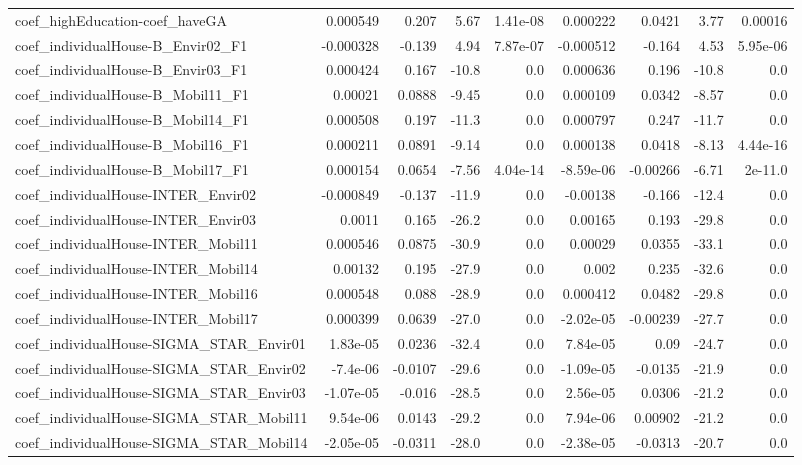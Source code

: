 \begin{tabular}{lrrrrrrrr}
coef_highEducation-coef_haveGA & 0.000549 & 0.207 & 5.67 & 1.41e-08 & 0.000222 & 0.0421 & 3.77 & 0.00016 \\
coef_individualHouse-B_Envir02_F1 & -0.000328 & -0.139 & 4.94 & 7.87e-07 & -0.000512 & -0.164 & 4.53 & 5.95e-06 \\
coef_individualHouse-B_Envir03_F1 & 0.000424 & 0.167 & -10.8 & 0.0 & 0.000636 & 0.196 & -10.8 & 0.0 \\
coef_individualHouse-B_Mobil11_F1 & 0.00021 & 0.0888 & -9.45 & 0.0 & 0.000109 & 0.0342 & -8.57 & 0.0 \\
coef_individualHouse-B_Mobil14_F1 & 0.000508 & 0.197 & -11.3 & 0.0 & 0.000797 & 0.247 & -11.7 & 0.0 \\
coef_individualHouse-B_Mobil16_F1 & 0.000211 & 0.0891 & -9.14 & 0.0 & 0.000138 & 0.0418 & -8.13 & 4.44e-16 \\
coef_individualHouse-B_Mobil17_F1 & 0.000154 & 0.0654 & -7.56 & 4.04e-14 & -8.59e-06 & -0.00266 & -6.71 & 2e-11.0 \\
coef_individualHouse-INTER_Envir02 & -0.000849 & -0.137 & -11.9 & 0.0 & -0.00138 & -0.166 & -12.4 & 0.0 \\
coef_individualHouse-INTER_Envir03 & 0.0011 & 0.165 & -26.2 & 0.0 & 0.00165 & 0.193 & -29.8 & 0.0 \\
coef_individualHouse-INTER_Mobil11 & 0.000546 & 0.0875 & -30.9 & 0.0 & 0.00029 & 0.0355 & -33.1 & 0.0 \\
coef_individualHouse-INTER_Mobil14 & 0.00132 & 0.195 & -27.9 & 0.0 & 0.002 & 0.235 & -32.6 & 0.0 \\
coef_individualHouse-INTER_Mobil16 & 0.000548 & 0.088 & -28.9 & 0.0 & 0.000412 & 0.0482 & -29.8 & 0.0 \\
coef_individualHouse-INTER_Mobil17 & 0.000399 & 0.0639 & -27.0 & 0.0 & -2.02e-05 & -0.00239 & -27.7 & 0.0 \\
coef_individualHouse-SIGMA_STAR_Envir01 & 1.83e-05 & 0.0236 & -32.4 & 0.0 & 7.84e-05 & 0.09 & -24.7 & 0.0 \\
coef_individualHouse-SIGMA_STAR_Envir02 & -7.4e-06 & -0.0107 & -29.6 & 0.0 & -1.09e-05 & -0.0135 & -21.9 & 0.0 \\
coef_individualHouse-SIGMA_STAR_Envir03 & -1.07e-05 & -0.016 & -28.5 & 0.0 & 2.56e-05 & 0.0306 & -21.2 & 0.0 \\
coef_individualHouse-SIGMA_STAR_Mobil11 & 9.54e-06 & 0.0143 & -29.2 & 0.0 & 7.94e-06 & 0.00902 & -21.2 & 0.0 \\
coef_individualHouse-SIGMA_STAR_Mobil14 & -2.05e-05 & -0.0311 & -28.0 & 0.0 & -2.38e-05 & -0.0313 & -20.7 & 0.0 \\

\end{tabular}
